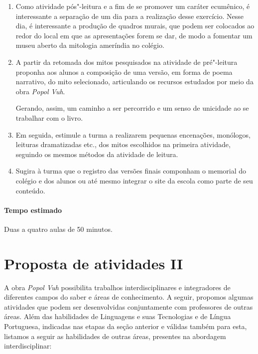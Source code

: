 \documentclass[12pt]{extarticle}
\begin{document}
\begin{enumerate}
\item
Como atividade pós"-leitura e a fim de se promover um caráter ecumênico, é
interessante a separação de um dia para a realização desse exercício. Nesse
dia, é interessante a produção de quadros murais, que podem ser
colocados ao redor do local em que as apresentações forem se dar, de
modo a fomentar um museu aberto da mitologia ameríndia no colégio. 

\item
A partir da retomada dos mitos pesquisados na atividade de pré"-leitura proponha aos 
alunos a composição de uma versão, em forma de poema narrativo, do mito selecionado, 
articulando os recursos estudados por meio da obra \emph{Popol Vuh}.

Gerando, assim, um caminho a ser percorrido e um senso de unicidade ao se trabalhar com o
livro. 

\item
Em seguida, estimule a turma a realizarem pequenas encenações,
monólogos, leituras dramatizadas etc., dos mitos escolhidos na primeira
atividade, seguindo os mesmos métodos da atividade de leitura.

\item
Sugira à turma que o registro das versões finais componham o memorial do colégio e
dos alunos ou até mesmo integrar o site da escola como parte de seu conteúdo.

\end{enumerate}

\paragraph{Tempo estimado} Duas a quatro aulas de 50 minutos. 

\section{Proposta de atividades II}

A obra \emph{Popol Vuh} possibilita trabalhos interdisciplinares e
integradores de diferentes campos do saber e áreas de conhecimento. A
seguir, propomos algumas atividades que podem ser desenvolvidas
conjuntamente com professores de outras áreas. Além das habilidades de
Linguagens e suas Tecnologias e de Língua Portuguesa, indicadas nas
etapas da seção anterior e válidas também para esta, listamos a seguir
as habilidades de outras áreas, presentes na abordagem interdisciplinar:
\end{document}
